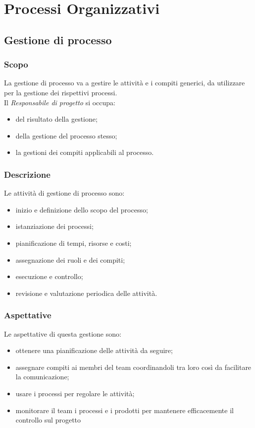 \section{Processi Organizzativi}
\subsection{Gestione di processo}
\subsubsection{Scopo}
La gestione di processo va a gestire le attività e i compiti generici, da utilizzare per la gestione dei rispettivi processi.\\
Il \textit{Responsabile di progetto} si occupa:
\begin{itemize}
    \item del risultato della gestione;
    \item della gestione del processo stesso;
    \item la gestioni dei compiti applicabili al processo.
\end{itemize}
\subsubsection{Descrizione}
Le attività di gestione di processo sono:
\begin{itemize}
    \item inizio e definizione dello scopo del processo;
    \item istanziazione dei processi;
    \item pianificazione di tempi, risorse e costi;
    \item assegnazione dei ruoli e dei compiti;
    \item esecuzione e controllo;
    \item revisione e valutazione  periodica delle attività.
\end{itemize}
\subsubsection{Aspettative}
Le aspettative di questa gestione sono:
\begin{itemize}
    \item ottenere una pianificazione delle attività da seguire;
    \item assegnare compiti ai membri del team coordinandoli tra loro così da facilitare la comunicazione;
    \item usare i processi per regolare le attività;
    \item monitorare il team i processi e i prodotti per mantenere efficacemente il controllo sul progetto
\end{itemize}
